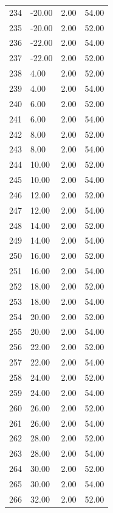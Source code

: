 \documentclass[a4paper,11pt]{article}
\begin{document}
\begin{center}
\begin{longtable}{|R{1.5cm}|R{2.4cm}|R{2.4cm}|R{2.4cm}|}
  234 & -20.00  &   2.00  &  54.00 \\ 
  235 & -20.00  &   2.00  &  52.00 \\ 
  236 & -22.00  &   2.00  &  54.00 \\ 
  237 & -22.00  &   2.00  &  52.00 \\ 
  238 &   4.00  &   2.00  &  52.00 \\ 
  239 &   4.00  &   2.00  &  54.00 \\ 
  240 &   6.00  &   2.00  &  52.00 \\ 
  241 &   6.00  &   2.00  &  54.00 \\ 
  242 &   8.00  &   2.00  &  52.00 \\ 
  243 &   8.00  &   2.00  &  54.00 \\ 
  244 &  10.00  &   2.00  &  52.00 \\ 
  245 &  10.00  &   2.00  &  54.00 \\ 
  246 &  12.00  &   2.00  &  52.00 \\ 
  247 &  12.00  &   2.00  &  54.00 \\ 
  248 &  14.00  &   2.00  &  52.00 \\ 
  249 &  14.00  &   2.00  &  54.00 \\ 
  250 &  16.00  &   2.00  &  52.00 \\ 
  251 &  16.00  &   2.00  &  54.00 \\ 
  252 &  18.00  &   2.00  &  52.00 \\ 
  253 &  18.00  &   2.00  &  54.00 \\ 
  254 &  20.00  &   2.00  &  52.00 \\ 
  255 &  20.00  &   2.00  &  54.00 \\ 
  256 &  22.00  &   2.00  &  52.00 \\ 
  257 &  22.00  &   2.00  &  54.00 \\ 
  258 &  24.00  &   2.00  &  52.00 \\ 
  259 &  24.00  &   2.00  &  54.00 \\ 
  260 &  26.00  &   2.00  &  52.00 \\ 
  261 &  26.00  &   2.00  &  54.00 \\ 
  262 &  28.00  &   2.00  &  52.00 \\ 
  263 &  28.00  &   2.00  &  54.00 \\ 
  264 &  30.00  &   2.00  &  52.00 \\ 
  265 &  30.00  &   2.00  &  54.00 \\ 
  266 &  32.00  &   2.00  &  52.00 \\ 

\end{longtable}
\end{center}
\end{document}
